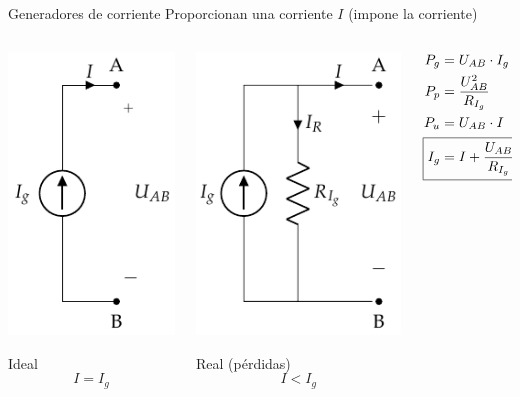 \documentclass[aspectratio=169, xcolor={usenames,svgnames,dvipsnames}]{beamer}
\begin{document}
\begin{frame}{Generadores de corriente}
Proporcionan una corriente $I$ (\alert{impone la corriente})
\begin{columns}
\begin{column}{0.3\columnwidth}
\begin{center}
\includegraphics[height=0.5\textheight]{../figs/FuenteCorrienteIdeal.pdf}

\alert{Ideal}
\begin{equation*}
    I=I_g
\end{equation*}
\end{center}
\end{column}
\begin{column}{0.3\columnwidth}
\begin{center}
\includegraphics[height=0.5\textheight]{../figs/FuenteCorrienteRealDC.pdf}

\alert{Real} (pérdidas)
\begin{equation*}
    I<I_g
\end{equation*}
\end{center}
\end{column}
\begin{column}{0.4\columnwidth}
\begin{align*}
    P_g&=U_{AB}\cdot I_g\\
    P_p&=\dfrac{U_{AB}^2}{R_{I_g}}\\
    P_u&=U_{AB}\cdot I\\
    \Aboxed{I_g&=I+\dfrac{U_{AB}}{R_{I_g}}}
\end{align*}
\end{column}
\end{columns}
\end{frame}
\end{document}

